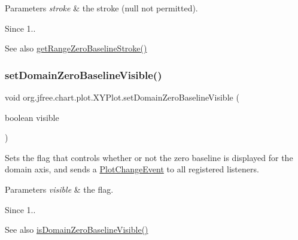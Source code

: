 \begin{DoxyParams}{Parameters}
{\em stroke} & the stroke ({\ttfamily null} not permitted).\\
\hline
\end{DoxyParams}
\begin{DoxySince}{Since}
1..
\end{DoxySince}
\begin{DoxySeeAlso}{See also}
\mbox{\hyperlink{classorg_1_1jfree_1_1chart_1_1plot_1_1_x_y_plot_a4e1e66786df0c680c395061558176470}{get\+Range\+Zero\+Baseline\+Stroke()}} 
\end{DoxySeeAlso}
\mbox{\label{classorg_1_1jfree_1_1chart_1_1plot_1_1_x_y_plot_ac7550f7b8a62959de2654cfe50970e36}} 
\subsubsection{\texorpdfstring{set\+Domain\+Zero\+Baseline\+Visible()}{setDomainZeroBaselineVisible()}}
{\footnotesize\ttfamily void org.\+jfree.\+chart.\+plot.\+X\+Y\+Plot.\+set\+Domain\+Zero\+Baseline\+Visible (\begin{DoxyParamCaption}\item[{boolean}]{visible }\end{DoxyParamCaption})}

Sets the flag that controls whether or not the zero baseline is displayed for the domain axis, and sends a \mbox{\hyperlink{}{Plot\+Change\+Event}} to all registered listeners.


\begin{DoxyParams}{Parameters}
{\em visible} & the flag.\\
\hline
\end{DoxyParams}
\begin{DoxySince}{Since}
1..
\end{DoxySince}
\begin{DoxySeeAlso}{See also}
\mbox{\hyperlink{classorg_1_1jfree_1_1chart_1_1plot_1_1_x_y_plot_aab7624f32aa6785f5d6b25c68f35e489}{is\+Domain\+Zero\+Baseline\+Visible()}} 
\end{DoxySeeAlso}
\mbox{\label{classorg_1_1jfree_1_1chart_1_1plot_1_1_x_y_plot_ae1a120279c51a385f7b7bcf2b564f32f}} 
